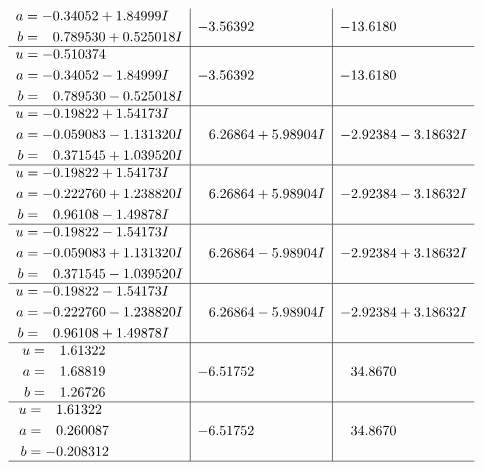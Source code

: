 \documentclass[1p]{elsarticle_modified}
\theoremstyle{definition}
\begin{document}
$$\begin{array}{c|c|c}
\begin{aligned}
a &= -0.34052 + 1.84999 I \\
b &= \phantom{-}0.789530 + 0.525018 I\end{aligned}
 & -3.56392\phantom{ +0.000000I} & -13.6180\phantom{ +0.000000I} \\ \hline\begin{aligned}
u &= -0.510374\phantom{ +0.000000I} \\
a &= -0.34052 - 1.84999 I \\
b &= \phantom{-}0.789530 - 0.525018 I\end{aligned}
 & -3.56392\phantom{ +0.000000I} & -13.6180\phantom{ +0.000000I} \\ \hline\begin{aligned}
u &= -0.19822 + 1.54173 I \\
a &= -0.059083 - 1.131320 I \\
b &= \phantom{-}0.371545 + 1.039520 I\end{aligned}
 & \phantom{-}6.26864 + 5.98904 I & -2.92384 - 3.18632 I \\ \hline\begin{aligned}
u &= -0.19822 + 1.54173 I \\
a &= -0.222760 + 1.238820 I \\
b &= \phantom{-}0.96108 - 1.49878 I\end{aligned}
 & \phantom{-}6.26864 + 5.98904 I & -2.92384 - 3.18632 I \\ \hline\begin{aligned}
u &= -0.19822 - 1.54173 I \\
a &= -0.059083 + 1.131320 I \\
b &= \phantom{-}0.371545 - 1.039520 I\end{aligned}
 & \phantom{-}6.26864 - 5.98904 I & -2.92384 + 3.18632 I \\ \hline\begin{aligned}
u &= -0.19822 - 1.54173 I \\
a &= -0.222760 - 1.238820 I \\
b &= \phantom{-}0.96108 + 1.49878 I\end{aligned}
 & \phantom{-}6.26864 - 5.98904 I & -2.92384 + 3.18632 I \\ \hline\begin{aligned}
u &= \phantom{-}1.61322\phantom{ +0.000000I} \\
a &= \phantom{-}1.68819\phantom{ +0.000000I} \\
b &= \phantom{-}1.26726\phantom{ +0.000000I}\end{aligned}
 & -6.51752\phantom{ +0.000000I} & \phantom{-}34.8670\phantom{ +0.000000I} \\ \hline\begin{aligned}
u &= \phantom{-}1.61322\phantom{ +0.000000I} \\
a &= \phantom{-}0.260087\phantom{ +0.000000I} \\
b &= -0.208312\phantom{ +0.000000I}\end{aligned}
 & -6.51752\phantom{ +0.000000I} & \phantom{-}34.8670\phantom{ +0.000000I}\\
 \hline 
 \end{array}$$\newpage\newpage\renewcommand{\arraystretch}{1}
\end{document}
